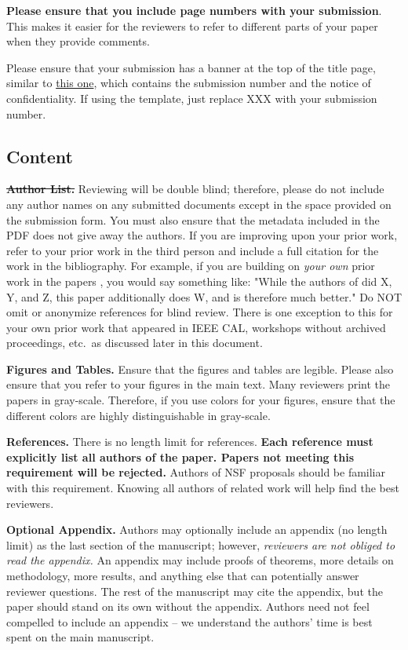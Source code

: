 \documentclass[pageno]{jpaper}
\begin{document}
\textbf{Please ensure that you include page numbers with your
submission}. This makes it easier for the reviewers to refer to different
parts of your paper when they provide comments.

Please ensure that your submission has a banner at the top of the title
page, similar to
\href{http://www.cs.utah.edu/asplos14/files/asplos14-template.pdf}{this
one}, which contains the submission number and the notice of
confidentiality.  If using the template, just replace XXX with your
submission number.

\subsection{Content}

\noindent\textbf{\sout{Author List.}} Reviewing will be double blind;
therefore, please do not include any author names on any submitted
documents except in the space provided on the submission form.  You must
also ensure that the metadata included in the PDF does not give away the
authors. If you are improving upon your prior work, refer to your prior
work in the third person and include a full citation for the work in the
bibliography.  For example, if you are building on {\em your own} prior
work in the papers \cite{nicepaper1,nicepaper2,nicepaper3}, you would say
something like: "While the authors of
\cite{nicepaper1,nicepaper2,nicepaper3} did X, Y, and Z, this paper
additionally does W, and is therefore much better."  Do NOT omit or
anonymize references for blind review.  There is one exception to this for
your own prior work that appeared in IEEE CAL, workshops without archived
proceedings, etc.\, as discussed later in this document.

\noindent\textbf{Figures and Tables.} Ensure that the figures and tables
are legible.  Please also ensure that you refer to your figures in the main
text.  Many reviewers print the papers in gray-scale. Therefore, if you use
colors for your figures, ensure that the different colors are highly
distinguishable in gray-scale.

\noindent\textbf{References.}  There is no length limit for references.
{\bf Each reference must explicitly list all authors of the paper.  Papers
not meeting this requirement will be rejected.} Authors of NSF proposals
should be familiar with this requirement. Knowing all authors of related
work will help find the best reviewers.

\noindent\textbf{Optional Appendix.}  Authors may optionally include an
appendix (no length limit) as the last section of the manuscript; however,
{\em reviewers are not obliged to read the appendix.}  An appendix may
include proofs of theorems, more details on methodology, more results, and
anything else that can potentially answer reviewer questions.  The rest of
the manuscript may cite the appendix, but the paper should stand on its own
without the appendix.  Authors need not feel compelled to include an
appendix -- we understand the authors' time is best spent on the main
manuscript.
\end{document}
